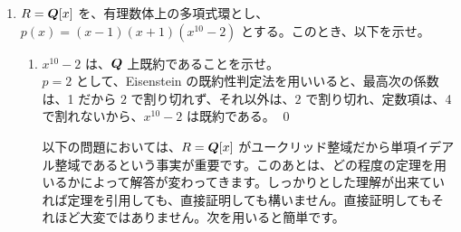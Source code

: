 \begin{enumerate}
\begin{enumerate}
     \item 上の $I$ と、$I'$ において、$I'$ が $R'$ の素イデアルならば、$I = f^{-1}(I')$ も素イデアルであることを示せ。\\
     \sol
     $I'$ は $R'$ の素イデアルだから、$R'/I'$ は整域である。ここで、$g = \pi\circ f$、$\pi$ は、$R'\to R'/I'$ なる自然な準同型とする。
     $$\ker g = f^{-1}(\ker \pi) = f^{-1}(I') = I$$
     だから前問より、$I$ は、$R$ の素イデアルである。
     \qed\\
     {\gt 別解．}\quad
     (b) より $I$ はイデアル。$x,y\in R$ で、$xy\in I$ とする。$I'\ni f(xy) = f(x)f(y)$ で、$I'$ が素イデアルだから、$f(x)\in I'$ または、$f(y)\in I'$。従って、$x\in I$ 又は、$y\in I$。これより、$I$ が素イデアルであることが分かる。この議論は (a) の証明にも同様に用いられる。
     \qed
     
     \item $R$ が単項イデアル整域ならば、$S^{-1}R$ も単項イデアル整域であることを示せ。
     \sol
     $I'$ を $S^{-1}R$ のイデアルとする。$f:R\to S^{-1}R$ を自然な準同型とすると、$I = f^{-1}(I')$ は (b) より単項イデアル整域 $R$ のイデアルだから、$I = (a)$ とかける。ここで、$I' = S^{-1}Rf(a)$ であることを示せばよい。$f(a)\in I'$ だから、$I' \supset S^{-1}Rf(a)$ であることは明か。$x/s\in I'$ とする。$f(x) = x/1 = sx/s \in I'$ だから、$x\in I$。$x = ra$、$r\in R$ とすると、
     $$x/s = ra/s = r/s(a/1) = r/sf(a)\in S^{-1}Rf(a)$$
     だから $I' \subset S^{-1}Rf(a)$ も成り立ち、$I'$ は単項イデアルとなる。
     \qed
          \end{enumerate}
         
\item $R = \mbox{\boldmath $Q$}[x]$ を、有理数体上の多項式環とし、$p(x) = (x-1)(x+1)(x^{10 }-2)$ とする。このとき、以下を示せ。
     \begin{enumerate}
     \item $x^{10 }- 2$ は、$\mbox{\boldmath $Q$}$ 上既約であることを示せ。\\
     \sol
     $p = 2$ として、Eisenstein の既約性判定法を用いいると、最高次の係数は、1 だから $2$ で割り切れず、それ以外は、$2$ で割り切れ、定数項は、4 で割れないから、$x^{10}-2$ は既約である。
     \qed
     
     \smallskip
     以下の問題においては、$R = \mbox{\boldmath $Q$}[x]$ がユークリッド整域だから単項イデアル整域であるという事実が重要です。このあとは、どの程度の定理を用いるかによって解答が変わってきます。しっかりとした理解が出来ていれば定理を引用しても、直接証明しても構いません。直接証明してもそれほど大変ではありません。次を用いると簡単です。
     

\end{enumerate}
\end{enumerate}
